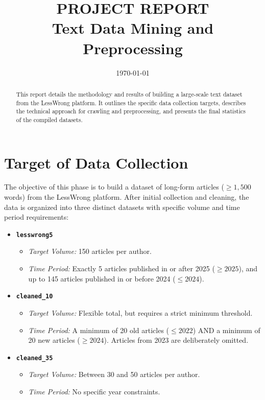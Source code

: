 \documentclass[12pt, a4paper]{article}
\title{\textbf{PROJECT REPORT}\\ \large Text Data Mining and Preprocessing}
\date{\today}
\begin{document}
\maketitle

\begin{abstract}
This report details the methodology and results of building a large-scale text dataset from the LessWrong platform. It outlines the specific data collection targets, describes the technical approach for crawling and preprocessing, and presents the final statistics of the compiled datasets.
\end{abstract}

\newpage
\tableofcontents
\newpage

\section{Target of Data Collection}
The objective of this phase is to build a dataset of long-form articles ($\ge 1,500$ words) from the LessWrong platform. After initial collection and cleaning, the data is organized into three distinct datasets with specific volume and time period requirements:

\begin{itemize}
    \item \textbf{\texttt{lesswrong5}}
    \begin{itemize}
        \item \textit{Target Volume:} 150 articles per author.
        \item \textit{Time Period:} Exactly 5 articles published in or after 2025 ($\ge 2025$), and up to 145 articles published in or before 2024 ($\le 2024$).
    \end{itemize}
    
    \item \textbf{\texttt{cleaned\_10}}
    \begin{itemize}
        \item \textit{Target Volume:} Flexible total, but requires a strict minimum threshold.
        \item \textit{Time Period:} A minimum of 20 old articles ($\le 2022$) AND a minimum of 20 new articles ($\ge 2024$). Articles from 2023 are deliberately omitted.
    \end{itemize}

    \item \textbf{\texttt{cleaned\_35}}
    \begin{itemize}
        \item \textit{Target Volume:} Between 30 and 50 articles per author.
        \item \textit{Time Period:} No specific year constraints.
    \end{itemize}
\end{itemize}
\end{document}
